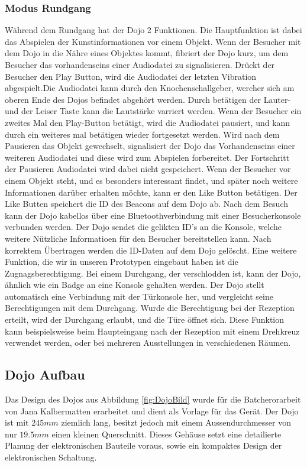 \subsubsection{Modus Rundgang}
Während dem Rundgang hat der Dojo 2 Funktionen. Die Hauptfunktion ist dabei das Abspielen der Kunstinformationen vor einem Objekt. Wenn der Besucher mit dem Dojo in die Nähre eines Objektes kommt, fibriert der Dojo kurz, um dem Besucher das vorhandenseins einer Audiodatei zu signalisieren. Drückt der Besucher den Play Button, wird die Audiodatei der letzten Vibration abgespielt.Die Audiodatei kann durch den Knochenschallgeber, wercher sich am oberen Ende des Dojos befindet abgehört werden. Durch betätigen der Lauter-und der Leiser Taste kann die Lautstärke varriert werden. Wenn der Besucher ein zweites Mal den Play-Button betätigt, wird die Audiodatei pausiert, und kann durch ein weiteres mal betätigen wieder fortgesetzt werden. Wird nach dem Pausieren das Objekt gewechselt, signalisiert der Dojo das Vorhandenseins einer weiteren Audiodatei und diese wird zum Abspielen forbereitet. Der Fortschritt der Pausieren Audiodatei wird dabei nicht gespeichert. Wenn der Besucher vor einem Objekt steht, und es besonders interessant findet, und später noch weitere Informationen darüber erhalten möchte, kann er den Like Button betätigen. Der Like Butten speichert die ID des Beacons auf dem Dojo ab. Nach dem Besuch kann der Dojo kabellos über eine Bluetoothverbindung mit einer Besucherkonsole verbunden werden. Der Dojo sendet die gelikten ID's an die Konsole, welche weitere Nützliche Informatioen für den Besucher bereitstellen kann. Nach korrektem Übertragen werden die ID-Daten auf dem Dojo gelöscht.
Eine weitere Funktion, die wir in unseren Prototypen eingebaut haben ist die Zugnagsberechtigung. Bei einem Durchgang, der verschlodden ist, kann der Dojo, ähnlich wie ein Badge an eine Konsole gehalten werden. Der Dojo stellt automatisch eine Verbindung mit der Türkonsole her, und vergleicht seine Berechtigungen mit dem Durchgang. Wurde die Berechtigung bei der Rezeption erteilt, wird der Durchgang erlaubt, und die Türe öffnet sich. Diese Funktion kann beispielsweise beim Haupteingang nach der Rezeption mit einem Drehkreuz verwendet werden, oder bei mehreren Ausstellungen in verschiedenen Räumen.
\clearpage
\subsection{Dojo Aufbau}
Das Design des Dojos aus Abbildung \ref{fig:DojoBild} wurde für die Batcherorarbeit von Jana Kalbermatten erarbeitet und dient als Vorlage für das Gerät. Der Dojo ist mit $245mm$ ziemlich lang, besitzt jedoch mit einem Aussendurchmesser von nur $19.5mm$ einen kleinen Querschnitt. Dieses Gehäuse setzt eine detailierte Planung der elektronischen Bauteile voraus, sowie ein kompaktes Design der elektronischen Schaltung.


